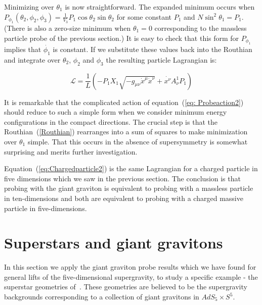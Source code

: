 \documentclass[a4paper,12pt]{article}
\begin{document}
Minimizing over $\theta_1$ is now straightforward. The expanded minimum occurs
when $P_{\phi_1}(\theta_2,\phi_2,\phi_3) = \frac{1}{V_3} P_1 \cos\theta_2 \sin \theta_2$
for some constant $P_1$ and $N\sin^2 \theta_1 = P_1$. 
(There is also a zero-size minimum when $\theta_1 = 0$ corresponding to the massless particle probe of the previous section.) It is easy to check that this form for $P_{\phi_1}$ implies that $\dot{\phi_1}$ is constant. If we substitute these values back into the Routhian and integrate over $\theta_2$, $\phi_2$ and $\phi_3$ the resulting particle Lagrangian is:

\begin{equation}
  \label{eq:Chargedparticle2}
  \mathcal{L} = \frac{1}{L} \left( -P_1 X_1\sqrt{-g_{\mu\nu}\dot{x}^{\mu}\dot{x}^{\nu}}  + \dot{x^{\nu}} A^1_{\nu} P_1 \right)
\end{equation}

It is remarkable that the complicated action of equation~(\ref{eq: Probeaction2}) should reduce to such a simple form when we consider minimum energy configurations in the compact directions. The crucial step is that the Routhian~(\ref{Routhian}) rearranges into a sum of squares to make minimization over $\theta_1$ simple. That this occurs in the absence of supersymmetry is somewhat surprising and merits further investigation.

Equation~(\ref{eq:Chargedparticle2}) is the same Lagrangian for a charged particle in five dimensions which we saw in the previous section. The conclusion is that probing with the giant graviton is equivalent to probing with a massless particle in ten-dimensions and both are equivalent to probing with a charged massive particle in five-dimensions.

\section{Superstars and giant gravitons}

In this section we apply the giant graviton probe results which we have found for general lifts of the five-dimensional supergravity, to study a specific example - the superstar geometries of~\cite{Cvetic:1999xp, Myers:2001aq}. These geometries are believed to be the supergravity backgrounds corresponding to a collection of giant gravitons in $AdS_5 \times S^5$.
 
\end{document}

